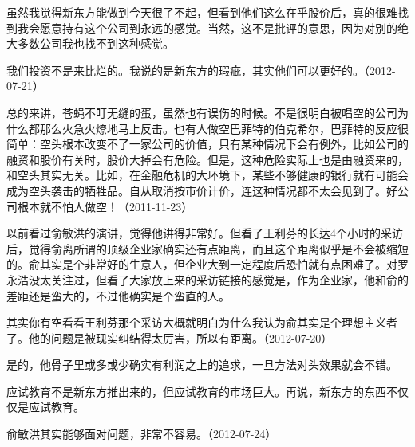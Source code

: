 虽然我觉得新东方能做到今天很了不起，但看到他们这么在乎股价后，真的很难找到我会愿意持有这个公司到永远的感觉。当然，这不是批评的意思，因为对别的绝大多数公司我也找不到这种感觉。


我们投资不是来比烂的。我说的是新东方的瑕疵，其实他们可以更好的。（2012-07-21）


总的来讲，苍蝇不叮无缝的蛋，虽然也有误伤的时候。不是很明白被唱空的公司为什么都那么火急火燎地马上反击。也有人做空巴菲特的伯克希尔，巴菲特的反应很简单：空头根本改变不了一家公司的价值，只有某种情况下会有例外，比如公司的融资和股价有关时，股价大掉会有危险。但是，这种危险实际上也是由融资来的，和空头其实无关。比如，在金融危机的大环境下，某些不够健康的银行就有可能会成为空头袭击的牺牲品。自从取消按市价计价，连这种情况都不太会见到了。好公司根本就不怕人做空！（2011-11-23）

以前看过俞敏洪的演讲，觉得他讲得非常好。但看了王利芬的长达4个小时的采访后，觉得俞离所谓的顶级企业家确实还有点距离，而且这个距离似乎是不会被缩短的。俞其实是个非常好的生意人，但企业大到一定程度后恐怕就有点困难了。对罗永浩没太关注过，但看了大家放上来的采访链接的感觉是，作为企业家，他和俞的差距还是蛮大的，不过他确实是个蛮直的人。

其实你有空看看王利芬那个采访大概就明白为什么我认为俞其实是个理想主义者了。他的问题是被现实纠结得太厉害，所以有距离。（2012-07-20）


是的，他骨子里或多或少确实有利润之上的追求，一旦方法对头效果就会不错。


应试教育不是新东方推出来的，但应试教育的市场巨大。再说，新东方的东西不仅仅是应试教育。


俞敏洪其实能够面对问题，非常不容易。（2012-07-24）


